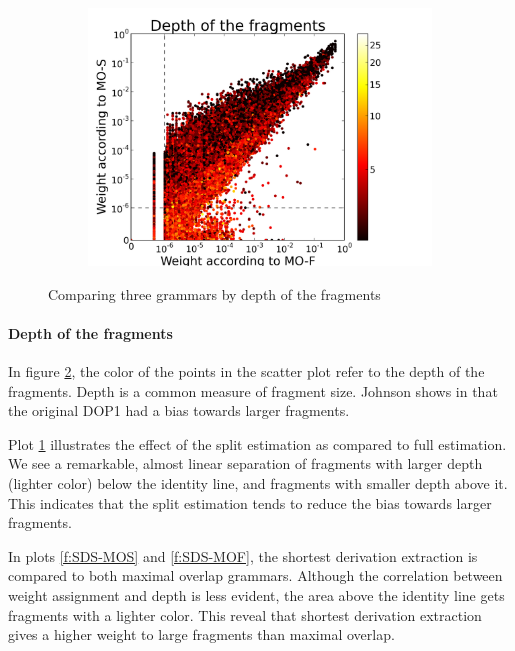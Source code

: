 \begin{figure}[t]
\begin{subfigure}{0.32\textwidth}
\includegraphics[width=\linewidth,trim=0.5cm 0cm 2.5cm 0.5cm, clip=true]{../data/plots/2.png}
\caption{}
\label{f:MOS-MOF}
\end{subfigure}

\caption{Comparing three grammars by depth of the fragments}
\label{f:depth3}
\end{figure}

\paragraph{Depth of the fragments}
In figure \ref{f:depth3}, the color of the points in the scatter plot refer to the depth of the fragments. Depth is a common measure of fragment size. Johnson shows in  that the original DOP1 had a bias towards larger fragments. 

Plot \ref{f:MOS-MOF} illustrates the effect of the split estimation as compared to full estimation. We see a remarkable, almost linear separation of fragments with larger depth (lighter color) below the identity line, and fragments with smaller depth above it. This indicates that the split estimation tends to reduce the bias towards larger fragments.

In plots \ref{f:SDS-MOS} and \ref{f:SDS-MOF}, the shortest derivation extraction is compared to both maximal overlap grammars. Although the correlation between weight assignment and depth is less evident, the area above the identity line gets fragments with a lighter color. This reveal that shortest derivation extraction gives a higher weight to large fragments than maximal overlap. 


